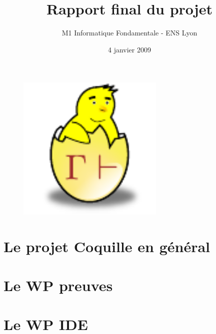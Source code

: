 \documentclass[a4paper,10pt]{article}
\date{4 janvier 2009}
\title{Rapport final du projet \coquille{}}
\author{M1 Informatique Fondamentale - ENS Lyon}
\begin{document}
\begin{figure}
\begin{center}
 \includegraphics[width=7cm]{poussin.pdf}
\end{center}
\end{figure}
\maketitle
\newpage

\tableofcontents
\newpage

\part{Le projet Coquille en g\'en\'eral}



\part{Le WP preuves}



\part{Le WP IDE}


% 



\end{document}
